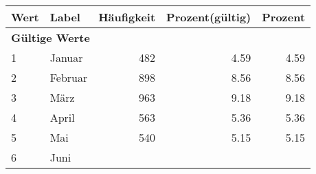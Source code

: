      \begin{longtable}{lXrrr}
     \toprule
     \textbf{Wert} & \textbf{Label} & \textbf{Häufigkeit} & \textbf{Prozent(gültig)} & \textbf{Prozent} \\
     \endhead
     \midrule
     \multicolumn{5}{l}{\textbf{Gültige Werte}}\\

     1 &
     \multicolumn{1}{X}{ Januar   } &


       \num{482} &
       \num[round-mode=places,round-precision=2]{4.59} &
         \num[round-mode=places,round-precision=2]{4.59} \\

     2 &
     \multicolumn{1}{X}{ Februar   } &


       \num{898} &
       \num[round-mode=places,round-precision=2]{8.56} &
         \num[round-mode=places,round-precision=2]{8.56} \\

     3 &
     \multicolumn{1}{X}{ März   } &


       \num{963} &
       \num[round-mode=places,round-precision=2]{9.18} &
         \num[round-mode=places,round-precision=2]{9.18} \\

     4 &
     \multicolumn{1}{X}{ April   } &


       \num{563} &
       \num[round-mode=places,round-precision=2]{5.36} &
         \num[round-mode=places,round-precision=2]{5.36} \\

     5 &
     \multicolumn{1}{X}{ Mai   } &


       \num{540} &
       \num[round-mode=places,round-precision=2]{5.15} &
         \num[round-mode=places,round-precision=2]{5.15} \\

     6 &
     \multicolumn{1}{X}{ Juni   } &



\end{longtable}
